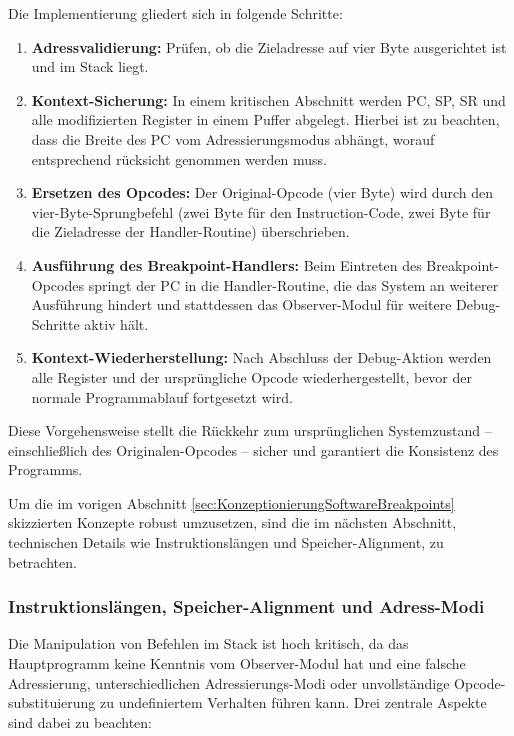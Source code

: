Die Implementierung gliedert sich in folgende Schritte:
\begin{enumerate}
	\item \textbf{Adressvalidierung:} Pr\"ufen, ob die Zieladresse auf vier Byte ausgerichtet ist und im Stack liegt.
	  
	\item \textbf{Kontext-Sicherung:} In einem kritischen Abschnitt werden PC, SP, SR und alle modifizierten Register in einem Puffer abgelegt. Hierbei ist zu beachten, dass die Breite des PC vom Adressierungsmodus abh\"angt, worauf entsprechend r\"ucksicht genommen werden muss. 
	
	\item \textbf{Ersetzen des Opcodes:} Der Original-Opcode (vier Byte) wird durch den vier-Byte-Sprungbefehl (zwei Byte f\"ur den Instruction-Code, zwei Byte f\"ur die Zieladresse der Handler-Routine) \"uberschrieben. 
	
	\item \textbf{Ausf\"uhrung des Breakpoint-Handlers:} Beim Eintreten des Breakpoint-Opcodes springt der PC in die Handler-Routine, die das System an weiterer Ausf\"uhrung hindert und stattdessen das Observer-Modul f\"ur weitere Debug-Schritte aktiv h\"alt.
	
	\item \textbf{Kontext-Wiederherstellung:} Nach Abschluss der Debug-Aktion werden alle Register und der urspr\"ungliche Opcode wiederhergestellt, bevor der normale Programmablauf fortgesetzt wird.
\end{enumerate}

Diese Vorgehensweise stellt die R\"uckkehr zum urspr\"unglichen Systemzustand – einschlie{\ss}lich des Originalen-Opcodes – sicher und garantiert die Konsistenz des Programms.

Um die im vorigen Abschnitt \ref{sec:KonzeptionierungSoftwareBreakpoints} skizzierten Konzepte robust umzusetzen, sind die im n\"achsten Abschnitt, technischen Details wie Instruktionsl\"angen und Speicher-Alignment, zu betrachten.\AI

\subsubsection{Instruktionsl\"angen, Speicher-Alignment und Adress-Modi}
\label{sec:TechnischeUmsetzunSoftwareBreakpoints}

Die Manipulation von Befehlen im Stack ist hoch kritisch, da das Hauptprogramm keine Kenntnis vom Observer-Modul hat und eine falsche Adressierung, unterschiedlichen Adressierungs-Modi oder unvollst\"andige Opcode-substituierung zu undefiniertem Verhalten f\"uhren kann. Drei zentrale Aspekte sind dabei zu beachten:

